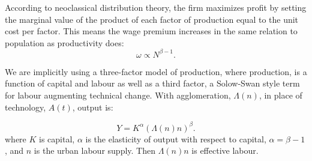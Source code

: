 According to \gls{neoclassical distribution theory}, the firm maximizes profit by setting the marginal value of the product of each \gls{factor of production} equal to the unit cost per factor. This means the wage premium increases in the same relation to population as \gls{productivity} does:
\begin{equation}
\omega\propto N^{\beta-1}.
\label{eqn-wage-population}
\end{equation}



 
 We are implicitly using a three-factor model of \gls{production}, where production, is a function of capital and labour as well as a third factor, a Solow-Swan style term for labour augmenting technical change.
 With \gls{agglomeration}, $\Lambda(n)$, in place of technology, $A(t)$, output is:

\begin{equation}
Y=K^{\alpha }(\Lambda(n)n)^{\beta }.
\label{Eqn:Prod1}
\end{equation}
where $K$ is capital, $\alpha$ is the elasticity of output with respect to capital, $\alpha = \beta - 1$, and  $n$ is the \gls{urban labour supply}. Then $\Lambda(n)n$ is \gls{effective labour}. 

